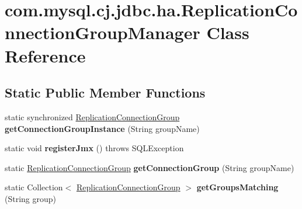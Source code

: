 \hypertarget{classcom_1_1mysql_1_1cj_1_1jdbc_1_1ha_1_1_replication_connection_group_manager}{}\section{com.\+mysql.\+cj.\+jdbc.\+ha.\+Replication\+Connection\+Group\+Manager Class Reference}
\label{classcom_1_1mysql_1_1cj_1_1jdbc_1_1ha_1_1_replication_connection_group_manager}
\subsection*{Static Public Member Functions}
\begin{DoxyCompactItemize}
\item 
\mbox{\label{classcom_1_1mysql_1_1cj_1_1jdbc_1_1ha_1_1_replication_connection_group_manager_a6b5ee75a1dcfcd04eb2ceb2d9a0a6cd6}} 
static synchronized \mbox{\hyperlink{classcom_1_1mysql_1_1cj_1_1jdbc_1_1ha_1_1_replication_connection_group}{Replication\+Connection\+Group}} {\bfseries get\+Connection\+Group\+Instance} (String group\+Name)
\item 
\mbox{\label{classcom_1_1mysql_1_1cj_1_1jdbc_1_1ha_1_1_replication_connection_group_manager_a1c2aea26a718086e4dc12f4219a3c322}} 
static void {\bfseries register\+Jmx} ()  throws S\+Q\+L\+Exception 
\item 
\mbox{\label{classcom_1_1mysql_1_1cj_1_1jdbc_1_1ha_1_1_replication_connection_group_manager_aeb41d1eb720977c09e22ce61921d59f0}} 
static \mbox{\hyperlink{classcom_1_1mysql_1_1cj_1_1jdbc_1_1ha_1_1_replication_connection_group}{Replication\+Connection\+Group}} {\bfseries get\+Connection\+Group} (String group\+Name)
\item 
\mbox{\label{classcom_1_1mysql_1_1cj_1_1jdbc_1_1ha_1_1_replication_connection_group_manager_a1ce7d74bfbe1f131117844b86b7451b0}} 
static Collection$<$ \mbox{\hyperlink{classcom_1_1mysql_1_1cj_1_1jdbc_1_1ha_1_1_replication_connection_group}{Replication\+Connection\+Group}} $>$ {\bfseries get\+Groups\+Matching} (String group)

\end{DoxyCompactItemize}
